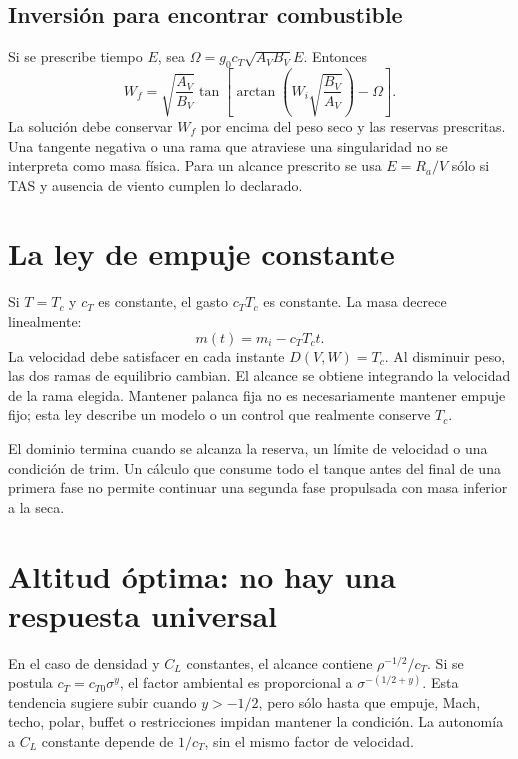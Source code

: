 \subsection{Inversión para encontrar combustible}
Si se prescribe tiempo $E$, sea $\Omega=g_0c_T\sqrt{A_VB_V}E$. Entonces
\begin{equation}
W_f=\sqrt{\frac{A_V}{B_V}}
\tan\!\left[\arctan\!\left(W_i\sqrt{\frac{B_V}{A_V}}\right)-\Omega\right].
\end{equation}
La solución debe conservar $W_f$ por encima del peso seco y las reservas prescritas. Una tangente negativa o una rama que atraviese una singularidad no se interpreta como masa física. Para un alcance prescrito se usa $E=R_a/V$ sólo si TAS y ausencia de viento cumplen lo declarado.

\section{La ley de empuje constante}
Si $T=T_c$ y $c_T$ es constante, el gasto $c_TT_c$ es constante. La masa decrece linealmente:
\begin{equation}
m(t)=m_i-c_TT_ct.
\end{equation}
La velocidad debe satisfacer en cada instante $D(V,W)=T_c$. Al disminuir peso, las dos ramas de equilibrio cambian. El alcance se obtiene integrando la velocidad de la rama elegida. Mantener palanca fija no es necesariamente mantener empuje fijo; esta ley describe un modelo o un control que realmente conserve $T_c$.

El dominio termina cuando se alcanza la reserva, un límite de velocidad o una condición de trim. Un cálculo que consume todo el tanque antes del final de una primera fase no permite continuar una segunda fase propulsada con masa inferior a la seca.


\section{Altitud óptima: no hay una respuesta universal}
En el caso de densidad y $C_L$ constantes, el alcance contiene $\rho^{-1/2}/c_T$. Si se postula $c_T=c_{T0}\sigma^y$, el factor ambiental es proporcional a $\sigma^{-(1/2+y)}$. Esta tendencia sugiere subir cuando $y>-1/2$, pero sólo hasta que empuje, Mach, techo, polar, buffet o restricciones impidan mantener la condición. La autonomía a $C_L$ constante depende de $1/c_T$, sin el mismo factor de velocidad.

